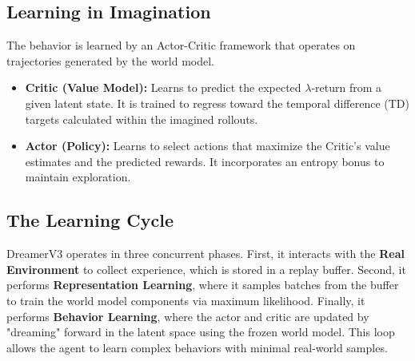 \subsection{Learning in Imagination}
The behavior is learned by an Actor-Critic framework that operates on trajectories generated by the world model. 

\begin{itemize}
    \item \textbf{Critic (Value Model):} Learns to predict the expected $\lambda$-return from a given latent state. It is trained to regress toward the temporal difference (TD) targets calculated within the imagined rollouts.
    \item \textbf{Actor (Policy):} Learns to select actions that maximize the Critic's value estimates and the predicted rewards. It incorporates an entropy bonus to maintain exploration.
\end{itemize}

\subsection{The Learning Cycle}
DreamerV3 operates in three concurrent phases. First, it interacts with the \textbf{Real Environment} to collect experience, which is stored in a replay buffer. Second, it performs \textbf{Representation Learning}, where it samples batches from the buffer to train the world model components via maximum likelihood. Finally, it performs \textbf{Behavior Learning}, where the actor and critic are updated by "dreaming" forward in the latent space using the frozen world model. This loop allows the agent to learn complex behaviors with minimal real-world samples.